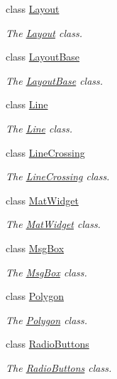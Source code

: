 \begin{DoxyCompactItemize}
class \hyperlink{classcanvascv_1_1Layout}{Layout}
\begin{DoxyCompactList}\small\item\em The \hyperlink{classcanvascv_1_1Layout}{Layout} class. \end{DoxyCompactList}\item 
class \hyperlink{classcanvascv_1_1LayoutBase}{Layout\+Base}
\begin{DoxyCompactList}\small\item\em The \hyperlink{classcanvascv_1_1LayoutBase}{Layout\+Base} class. \end{DoxyCompactList}\item 
class \hyperlink{classcanvascv_1_1Line}{Line}
\begin{DoxyCompactList}\small\item\em The \hyperlink{classcanvascv_1_1Line}{Line} class. \end{DoxyCompactList}\item 
class \hyperlink{classcanvascv_1_1LineCrossing}{Line\+Crossing}
\begin{DoxyCompactList}\small\item\em The \hyperlink{classcanvascv_1_1LineCrossing}{Line\+Crossing} class. \end{DoxyCompactList}\item 
class \hyperlink{classcanvascv_1_1MatWidget}{Mat\+Widget}
\begin{DoxyCompactList}\small\item\em The \hyperlink{classcanvascv_1_1MatWidget}{Mat\+Widget} class. \end{DoxyCompactList}\item 
class \hyperlink{classcanvascv_1_1MsgBox}{Msg\+Box}
\begin{DoxyCompactList}\small\item\em The \hyperlink{classcanvascv_1_1MsgBox}{Msg\+Box} class. \end{DoxyCompactList}\item 
class \hyperlink{classcanvascv_1_1Polygon}{Polygon}
\begin{DoxyCompactList}\small\item\em The \hyperlink{classcanvascv_1_1Polygon}{Polygon} class. \end{DoxyCompactList}\item 
class \hyperlink{classcanvascv_1_1RadioButtons}{Radio\+Buttons}
\begin{DoxyCompactList}\small\item\em The \hyperlink{classcanvascv_1_1RadioButtons}{Radio\+Buttons} class. \end{DoxyCompactList}\item 

\end{DoxyCompactItemize}
